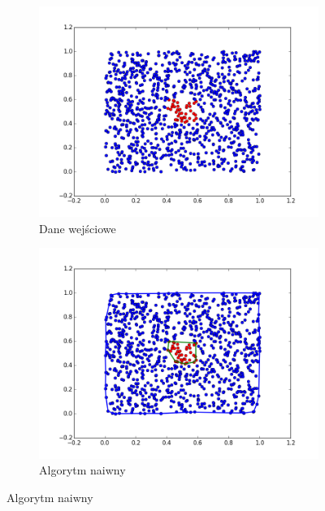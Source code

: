 \begin{figure}[h!]
    \centering
    \begin{subfigure}[b]{0.5\linewidth}
        \includegraphics[width=\linewidth]{img/test2_1.png}
        \caption{Dane wejściowe}
    \end{subfigure}%
    \begin{subfigure}[b]{0.5\linewidth}
        \includegraphics[width=\linewidth]{img/test2_2.png}
        \caption{Algorytm naiwny}
    \end{subfigure}%


\end{figure}
